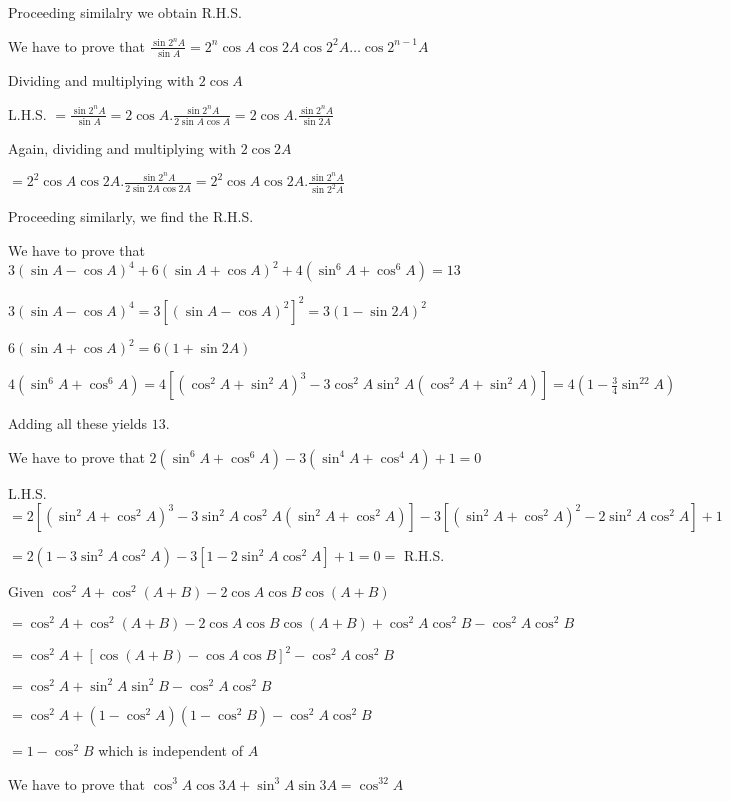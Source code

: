   Proceeding similalry we obtain R.H.S.

\item We have to prove that $\frac{\sin2^nA}{\sin A} = 2^n\cos A\cos 2A\cos 2^2A\ldots\cos2^{n - 1}A$

  Dividing and multiplying with $2\cos A$

  L.H.S. $= \frac{\sin2^nA}{\sin A} = 2\cos A.\frac{\sin2^nA}{2\sin A\cos A} = 2\cos A.\frac{\sin2^nA}{\sin 2A}$

  Again, dividing and multiplying with $2\cos 2A$

  $= 2^2\cos A\cos 2A.\frac{\sin2^n A}{2\sin 2A\cos 2A} = 2^2\cos A\cos 2A.\frac{\sin2^n A}{\sin 2^2A}$

  Proceeding similarly, we find the R.H.S.

\item We have to prove that $3(\sin A - \cos A)^4 + 6(\sin A + \cos A)^2 + 4(\sin^6A + \cos^6A) = 13$

  $3(\sin A - \cos A)^4 = 3[(\sin A - \cos A)^2]^2 = 3(1 - \sin 2A)^2$

  $6(\sin A + \cos A)^2 = 6(1 + \sin2A)$

  $4(\sin^6A + \cos^6A) = 4[(\cos^2A + \sin^2A)^3 - 3\cos^2A\sin^2A(\cos^2A + \sin^2A)] = 4(1 - \frac{3}{4}\sin^22A)$

  Adding all these yields $13.$

\item We have to prove that $2(\sin^6A + \cos^6A) - 3(\sin^4A + \cos^4A) + 1 = 0$

  L.H.S. $= 2[(\sin^2A + \cos^2A)^3 - 3\sin^2A\cos^2A(\sin^2A + \cos^2A)] -3[(\sin^2A + \cos^2A)^2 - 2\sin^2A\cos^2A] + 1$

  $= 2(1 - 3\sin^2A\cos^2A) - 3[1 - 2\sin^2A\cos^2A] + 1 = 0 =$ R.H.S.

\item Given $\cos^2A + \cos^2(A + B) -2\cos A\cos B\cos(A + B)$

  $= \cos^2A + \cos^2(A + B) -2\cos A\cos B\cos(A + B) + \cos^2A\cos^2B - \cos^2A\cos^2B$

  $= \cos^2A + [\cos(A + B) - \cos A\cos B]^2 - \cos^2A\cos^2B$

  $= \cos^2A + \sin^2A\sin^2B - \cos^2A\cos^2B$

  $= \cos^2A + (1 - \cos^2A)(1 - \cos^2B) - \cos^2A\cos^2B$

  $= 1 - \cos^2B$ which is independent of $A$

\item We have to prove that $\cos^3A\cos 3A + \sin^3A\sin 3A = \cos^32A$

